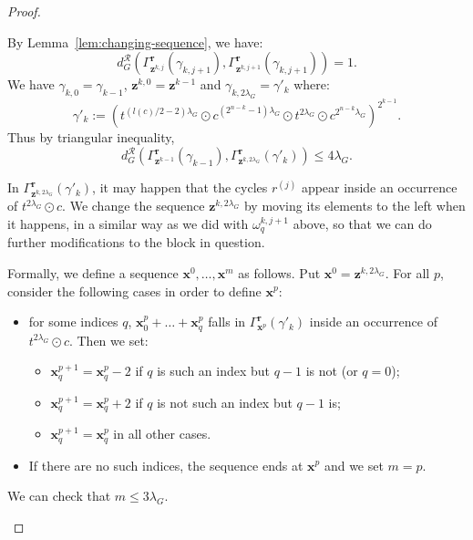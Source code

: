 \documentclass{article}
\begin{document}
\begin{proof}
\begin{enumerate}
By Lemma~\ref{lem:changing-sequence}, we have:
\[d^{\mathcal{R}}_G\left(\Gamma^{\textbf{r}}_{\textbf{z}^{k,j}}(\gamma_{k,j+1}), \Gamma^{\textbf{r}}_{\textbf{z}^{k, j+1}}(\gamma_{k,{j+1}})\right) = 1.
\]
We have $\gamma_{k,0} = \gamma_{k-1}$, $\textbf{z}^{k,0} = \textbf{z}^{k-1}$ and $\gamma_{k,2\lambda_G} = \gamma'_{k}$ where:
\[
\gamma'_{k} := \left(t^{(l(c)/2-2)\lambda_G} \odot c^{\left(2^{n-k}-1\right)\lambda_G} \odot t^{2\lambda_G} \odot c^{2^{n-k}\lambda_G} \right)^{2^{k-1}}.
\]
Thus by triangular inequality,
\begin{equation}\label{eq:1}
d^{\mathcal{R}}_G \left( \Gamma^{\textbf{r}}_{\textbf{z}^{k-1}}(\gamma_{k-1}), \Gamma^{\textbf{r}}_{\textbf{z}^{k, 2\lambda_G}}(\gamma'_{k})\right)\le 4\lambda_G.
\end{equation}

In $\Gamma^{\textbf{r}}_{\textbf{z}^{k, 2\lambda_G}}(\gamma'_{k})$, it may happen that the cycles $r^{(j)}$ appear inside an occurrence of $t^{2\lambda_G} \odot c$.
We change the sequence $\textbf{z}^{k, 2\lambda_G}$ by moving its elements to the left when it happens, in a similar way as we did with $\omega_q^{k,j+1}$ above, so that we can do further modifications to the block in question.

Formally, we define a sequence $\textbf{x}^{0}, \dots , \textbf{x}^{m}$ as follows. Put $\textbf{x}^0 = \textbf{z}^{k, 2\lambda_G}$. For all $p$, consider the following cases in order to define $\textbf{x}^p$:
\begin{itemize}
    \item for some indices $q$, $\textbf{x}^p_0 + \dots + \textbf{x}^p_q$ falls in $\Gamma^{\textbf{r}}_{\textbf{x}^{p}}(\gamma'_{k})$ inside an occurrence of  $t^{2\lambda_G} \odot c$. Then we set:
    \begin{itemize}
        \item $\textbf{x}^{p+1}_q = \textbf{x}^{p}_q - 2$ if $q$ is such an index but $q-1$ is not (or $q=0$);
        \item $\textbf{x}^{p+1}_q = \textbf{x}^{p}_q+2$ if $q$ is not such an index but $q-1$ is;
        \item $\textbf{x}^{p+1}_q = \textbf{x}^{p}_q$ in all other cases.
    \end{itemize}
    \item If there are no such indices, the sequence ends at $\textbf{x}^{p}$ and we set $m=p$.
\end{itemize}

We can check that $m \le 3\lambda_G$.


\end{enumerate}
\end{proof}
\end{document}
